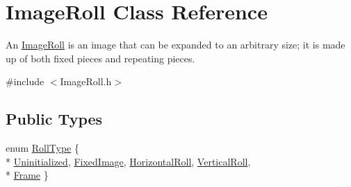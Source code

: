 \hypertarget{class_image_roll}{}\section{Image\+Roll Class Reference}
\label{class_image_roll}


An \hyperlink{class_image_roll}{Image\+Roll} is an image that can be expanded to an arbitrary size; it is made up of both fixed pieces and repeating pieces.  




{\ttfamily \#include $<$Image\+Roll.\+h$>$}

\subsection*{Public Types}
\begin{DoxyCompactItemize}
\item 
enum \hyperlink{class_image_roll_a82fea9dd1b4fa9e6a864c3b3ca6ced2e}{Roll\+Type} \{ \\*
\hyperlink{class_image_roll_a82fea9dd1b4fa9e6a864c3b3ca6ced2eaddc01575fa63ae63abf20120c318ba2f}{Uninitialized}, 
\hyperlink{class_image_roll_a82fea9dd1b4fa9e6a864c3b3ca6ced2ea306acc904b80d6a85ed87bf6fb75b6c9}{Fixed\+Image}, 
\hyperlink{class_image_roll_a82fea9dd1b4fa9e6a864c3b3ca6ced2eaa6fc97d830448c40c512bc33c32452df}{Horizontal\+Roll}, 
\hyperlink{class_image_roll_a82fea9dd1b4fa9e6a864c3b3ca6ced2ea7e2c75718ccc5c023b087cb0d9c4231e}{Vertical\+Roll}, 
\\*
\hyperlink{class_image_roll_a82fea9dd1b4fa9e6a864c3b3ca6ced2ea06901bd0166f99ce1234bf92b0a4f56f}{Frame}
 \}
\end{DoxyCompactItemize}
